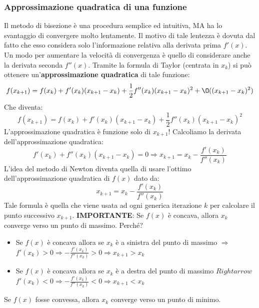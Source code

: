 \documentclass[12pt]{article}
\begin{document}
\subsubsection{Approssimazione quadratica di una funzione}
Il metodo di bisezione è una procedura semplice ed intuitiva, MA ha lo svantaggio di convergere molto lentamente.
Il motivo di tale lentezza è dovuta dal fatto che esso considera solo l'informazione relativa alla derivata prima $f'(x)$.
Un modo per aumentare la velocità di convergenza è quello di considerare anche la derivata seconda $f''(x)$.
Tramite la formula di Taylor (centrata in $x_k$) si può ottenere un'\textbf{approssimazione quadratica} di tale funzione:
$$f(x_{k+1}) = f(x_k) + f'(x_k)(x_{k+1}-x_k) + \frac{1}{2}f''(x_k)(x_{k+1}-x_k)^2 + \O((x_{k+1} - x_k)^2)$$
Che diventa:
$$f(x_{k+1}) = f(x_k) + f'(x_k)(x_{k+1}-x_k) + \frac{1}{2}f''(x_k)(x_{k+1}-x_k)^2$$
L'approssimazione quadratica è funzione solo di $x_{k+1}$! Calcoliamo la derivata dell'approssimazione quadratica:
$$f'(x_k) + f''(x_k)(x_{k+1}-x_k) = 0 \Rightarrow x_{k+1} = x_k - \frac{f'(x_k)}{f''(x_k)}$$
L'idea del metodo di Newton diventa quella di usare l'ottimo dell'approssimazione quadratica di $f(x)$ dato da:
$$x_{k+1} = x_k - \frac{f'(x_k)}{f''(x_k)}$$
Tale formula è quella che viene usata ad ogni generica iterazione $k$ per calcolare il punto successivo $x_{k+1}$. \newline
\textbf{IMPORTANTE}: Se $f(x)$ è concava, allora $x_k$ converge verso un punto di massimo. Perché?
\begin{itemize}
    \item Se $f(x)$ è concava allora se $x_k$ è a sinistra del punto di massimo $\Rightarrow$ $f'(x_k) > 0 \Rightarrow -\frac{f'(x_k)}{f''(x_k)} > 0 \Rightarrow x_{k+1} > x_k$
    \item Se $f(x)$ è concava allora se $x_k$ è a destra del punto di massimo $Rightarrow$ $f'(x_k) < 0 \Rightarrow - \frac{f'(x_k)}{f''(x_k)} < 0 \Rightarrow x_{k+1} < x_k$
\end{itemize}
Se $f(x)$ fosse convessa, allora $x_k$ converge verso un punto di minimo.
\end{document}
